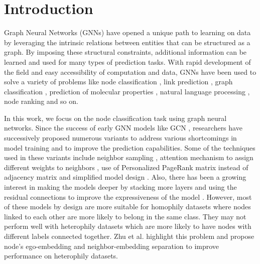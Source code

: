 \documentclass[sigconf,natbib=false]{acmart}
\begin{document}




\maketitle

\section{Introduction}
\label{introduction}
Graph Neural Networks (GNNs) have opened a unique path to learning on data by leveraging the intrinsic relations between entities that can be structured as a graph. By imposing these structural constraints, additional information can be learned and used for many types of prediction tasks. With rapid development of the field and easy accessibility of computation and data, GNNs have been used to solve a variety of problems like node classification \cite{kipf_semi-supervised_2017,velickovic_graph_2017,abu-el-haija_mixhop_2019,chen_simple_2020}, link prediction \cite{ying_graph_2018,berg_graph_2017,chami_hyperbolic_2019}, graph classification \cite{ying_hierarchical_2018,zhang_end--end_2018}, prediction of molecular properties \cite{gilmer_neural_2017,madhawa_graphnvp_2019}, natural language processing \cite{marcheggiani_encoding_2017}, node ranking \cite{maurya_fast_2019} and so on.

In this work, we focus on the node classification task using graph neural networks. Since the success of early GNN models like GCN \cite{kipf_semi-supervised_2017}, researchers have successively proposed numerous variants \cite{wu_comprehensive_2019} to address various shortcomings in model training and to improve the prediction capabilities. Some of the techniques used in these variants include  neighbor sampling \cite{hamilton_inductive_2017,chen_fastgcn:_2018}, attention mechanism to assign different weights to neighbors \cite{velickovic_graph_2017}, use of Personalized PageRank matrix instead of adjacency matrix \cite{klicpera_predict_2018} and simplified model design \cite{wu_simplifying_2019}. Also, there has been a growing interest in making the models deeper by stacking more layers and using the residual connections to improve the expressiveness of the model \cite{rong_dropedge_2020,chen_simple_2020}.
However, most of these models by design are more suitable for homophily datasets where nodes linked to each other are more likely to belong in the same class. They may not perform well with heterophily datasets which are more likely to have nodes with different labels connected together. Zhu et al. \cite{zhu_beyond_2020} highlight this problem and propose node's ego-embedding and neighbor-embedding separation to improve performance on heterophily datasets. 
\end{document}
